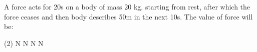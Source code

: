 \item A force acts for 20s on a body of mass 20 kg, starting from rest, after which the force ceases and then body describes 50m in the next 10s. The value of force will be:
\begin{tasks}(2)
     N
     N
     N
     N
\end{tasks}